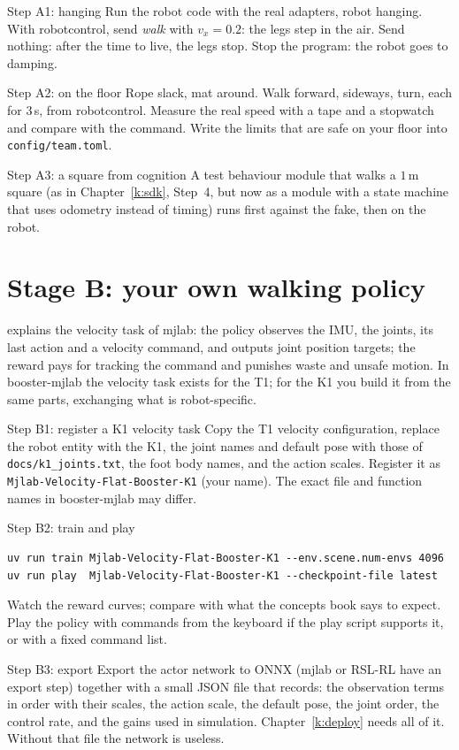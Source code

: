 \begin{stepbox}{Step A1: hanging}
Run the robot code with the real adapters, robot hanging. With robotcontrol, send \emph{walk} with $v_x=0.2$: the legs step in the air. Send nothing: after the time to live, the legs stop. Stop the program: the robot goes to damping.
\end{stepbox}
\begin{stepbox}{Step A2: on the floor}
Rope slack, mat around. Walk forward, sideways, turn, each for $3$\,s, from robotcontrol. Measure the real speed with a tape and a stopwatch and compare with the command. Write the limits that are safe on your floor into \texttt{config/team.toml}.
\end{stepbox}
\begin{stepbox}{Step A3: a square from cognition}
A test behaviour module that walks a $1$\,m square (as in Chapter~\ref{k:sdk}, Step~4, but now as a module with a state machine that uses odometry instead of timing) runs first against the fake, then on the robot.
\end{stepbox}

\section*{Stage B: your own walking policy}
 explains the velocity task of mjlab: the policy observes the IMU, the joints, its last action and a velocity command, and outputs joint position targets; the reward pays for tracking the command and punishes waste and unsafe motion. In booster-mjlab the velocity task exists for the T1; for the K1 you build it from the same parts, exchanging what is robot-specific.
\begin{stepbox}{Step B1: register a K1 velocity task}
Copy the T1 velocity configuration, replace the robot entity with the K1, the joint names and default pose with those of \texttt{docs/k1\_joints.txt}, the foot body names, and the action scales. Register it as \texttt{Mjlab-Velocity-Flat-Booster-K1} (your name). The exact file and function names in booster-mjlab may differ\guess.
\end{stepbox}
\begin{stepbox}{Step B2: train and play}
\begin{verbatim}
uv run train Mjlab-Velocity-Flat-Booster-K1 --env.scene.num-envs 4096
uv run play  Mjlab-Velocity-Flat-Booster-K1 --checkpoint-file latest
\end{verbatim}
Watch the reward curves; compare with what the concepts book says to expect. Play the policy with commands from the keyboard if the play script supports it, or with a fixed command list.
\end{stepbox}
\begin{stepbox}{Step B3: export}
Export the actor network to ONNX (mjlab or RSL-RL have an export step\guess) together with a small JSON file that records: the observation terms in order with their scales, the action scale, the default pose, the joint order, the control rate, and the gains used in simulation. Chapter~\ref{k:deploy} needs all of it. Without that file the network is useless.
\end{stepbox}

